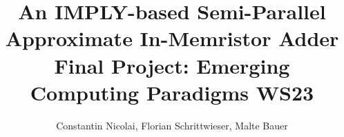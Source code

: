 \documentclass[]{IEEEtran}
\begin{document}
\title{An IMPLY-based Semi-Parallel Approximate In-Memristor Adder\\
Final Project: Emerging Computing Paradigms WS23}

\author{Constantin Nicolai, Florian Schrittwieser, Malte Bauer}

%
%








\maketitle
\end{document}
